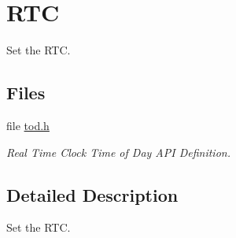 \hypertarget{group__shared__tod}{}\section{R\+TC}
\label{group__shared__tod}


Set the R\+TC.  


\subsection*{Files}
\begin{DoxyCompactItemize}
\item 
file \mbox{\hyperlink{tod_8h}{tod.\+h}}
\begin{DoxyCompactList}\small\item\em Real Time Clock Time of Day A\+PI Definition. \end{DoxyCompactList}\end{DoxyCompactItemize}


\subsection{Detailed Description}
Set the R\+TC. 

